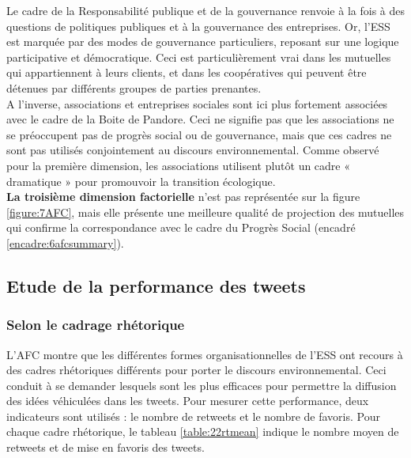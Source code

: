             Le cadre de la Responsabilité publique et de la gouvernance renvoie à la fois à des questions de politiques publiques et à la gouvernance des entreprises. Or, l’ESS est marquée par des modes de gouvernance particuliers, reposant sur une logique participative et démocratique. Ceci est particulièrement vrai dans les mutuelles qui appartiennent à leurs clients, et dans les coopératives qui peuvent être détenues par différents groupes de parties prenantes. \\

            A l’inverse, associations et entreprises sociales sont ici plus fortement associées avec le cadre de la Boite de Pandore. Ceci ne signifie pas que les associations ne se préoccupent pas de progrès social ou de gouvernance, mais que ces cadres ne sont pas utilisés conjointement au discours environnemental. Comme observé pour la première dimension, les associations utilisent plutôt un cadre « dramatique » pour promouvoir la transition écologique.  \\

            \textbf{La troisième dimension factorielle} n’est pas représentée sur la figure \ref{figure:7AFC}, mais elle présente une meilleure qualité de projection des mutuelles qui confirme la correspondance avec le cadre du Progrès Social (encadré \ref{encadre:6afcsummary}).




    \subsection{Etude de la performance des tweets }

        \subsubsection{Selon le cadrage rhétorique}

            L’AFC montre que les différentes formes organisationnelles de l’ESS ont recours à des cadres rhétoriques différents pour porter le discours environnemental. Ceci conduit à se demander lesquels sont les plus efficaces pour permettre la diffusion des idées véhiculées dans les tweets. Pour mesurer cette performance, deux indicateurs sont utilisés : le nombre de retweets et le nombre de favoris. Pour chaque cadre rhétorique, le tableau \ref{table:22rtmean} indique le nombre moyen de retweets et de mise en favoris des tweets.


